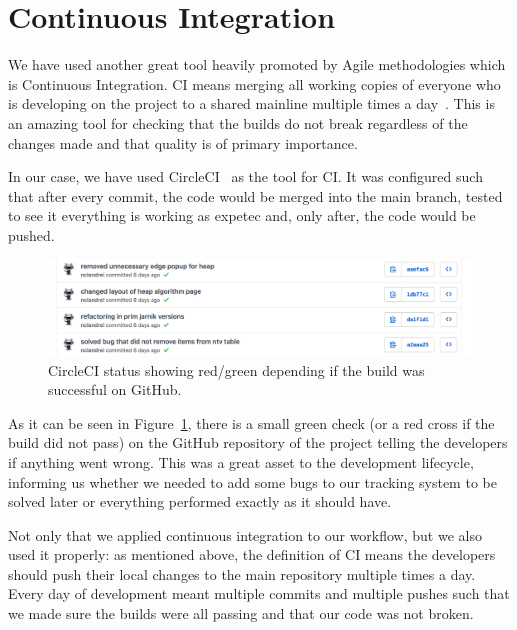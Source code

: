\documentclass{l4proj}
\begin{document}
\section{Continuous Integration}

We have used another great tool heavily promoted by Agile methodologies which is Continuous Integration. CI means
merging all working copies of everyone who is developing on the project to a shared mainline multiple times a
day~\cite{continuous-integration}. This is an amazing tool for checking that the builds do not break regardless of the
changes made and that quality is of primary importance.

In our case, we have used CircleCI~\cite{circleci} as the tool for CI. It was configured such that after every
commit, the code would be merged into the main branch, tested to see it everything is working as expetec and, only
after, the code would be pushed.

\begin{figure}[!ht]
    \centering
    \includegraphics[scale=0.5]{circleci}
    \caption{CircleCI status showing red/green depending if the build was successful on GitHub.}
    \label{fig:circleci}
\end{figure}

As it can be seen in Figure~\ref{fig:circleci}, there is a small green check (or a red cross if the build did not pass) on the GitHub repository
of the project telling the developers if anything went wrong. This was a great asset to the development lifecycle,
informing us whether we needed to add some bugs to our tracking system to be solved later or everything performed
exactly as it should have.

Not only that we applied continuous integration to our workflow, but we also used it properly: as
mentioned above, the definition of CI means the developers should push their local changes to the main repository
multiple times a day. Every day of development meant multiple commits and multiple pushes such that we made sure the
builds were all passing and that our code was not broken.
\end{document}
